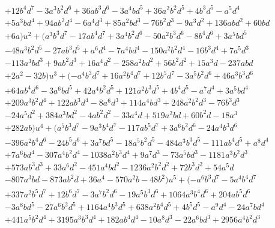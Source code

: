 \documentclass{gtpart}
\theoremstyle{definition}
\theoremstyle{remark}
\begin{document}
\begin{equation*}
\begin{split}
      & + 12 b^4 d^7 - 3 a^3 b^2 d^6 + 36 a b^3 d^6 - 3 a^4 b d^5 + 36 a^2 b^2 d^5 + 4 b^3 d^5 - a^5 d^4 \\
      & + 5 a^3 b d^4 + 94 a b^2 d^4 - 6 a^4 d^3 + 85 a^2 b d^3 - 76 b^2 d^3 - 9 a^3 d^2 + 136 a b d^2 + 60 b d \\
      & + 6 a) u^2 + (a^3 b^3 d^7 - 17 a b^4 d^7 + 3 a^4 b^2 d^6 - 50 a^2 b^3 d^6 - 8 b^4 d^6 + 3 a^5 b d^5 \\
      & - 48 a^3 b^2 d^5 - 27 a b^3 d^5 + a^6 d^4 - 7 a^4 b d^4 - 150 a^2 b^2 d^4 - 16 b^3 d^4 + 7 a^5 d^3 \\
      & - 113 a^3 b d^3 + 9 a b^2 d^3 + 16 a^4 d^2 - 258 a^2 b d^2 + 56 b^2 d^2 + 15 a^3 d - 237 a b d \\
      & + 2 a^2 - 32 b) u^3 + (-a^4 b^3 d^7 + 16 a^2 b^4 d^7 + 12 b^5 d^7 - 3 a^5 b^2 d^6 + 46 a^3 b^3 d^6 \\
      & + 64 a b^4 d^6 - 3 a^6 b d^5 + 42 a^4 b^2 d^5 + 121 a^2 b^3 d^5 + 4 b^4 d^5 - a^7 d^4 + 3 a^5 b d^4 \\
      & + 209 a^3 b^2 d^4 + 122 a b^3 d^4 - 8 a^6 d^3 + 114 a^4 b d^3 + 248 a^2 b^2 d^3 - 76 b^3 d^3 \\
      & - 24 a^5 d^2 + 384 a^3 b d^2 - 4 a b^2 d^2 - 33 a^4 d + 519 a^2 b d + 60 b^2 d - 18 a^3 \\
      & + 282 a b) u^4 + (a^5 b^3 d^7 - 9 a^3 b^4 d^7 - 117 a b^5 d^7 + 3 a^6 b^2 d^6 - 24 a^4 b^3 d^6 \\
      & - 396 a^2 b^4 d^6 - 24 b^5 d^6 + 3 a^7 b d^5 - 18 a^5 b^2 d^5 - 484 a^3 b^3 d^5 - 111 a b^4 d^5 + a^8 d^4 \\
      & + 7 a^6 b d^4 - 307 a^4 b^2 d^4 - 1038 a^2 b^3 d^4 + 9 a^7 d^3 - 73 a^5 b d^3 - 1181 a^3 b^2 d^3 \\
      & + 573 a b^3 d^3 + 33 a^6 d^2 - 451 a^4 b d^2 - 1236 a^2 b^2 d^2 + 72 b^3 d^2 + 54 a^5 d \\
      & - 807 a^3 b d - 873 a b^2 d + 36 a^4 - 570 a^2 b - 48 b^2) u^5 + (-a^6 b^3 d^7 - 5 a^4 b^4 d^7 \\
      & + 337 a^2 b^5 d^7 + 12 b^6 d^7 - 3 a^7 b^2 d^6 - 19 a^5 b^3 d^6 + 1064 a^3 b^4 d^6 + 204 a b^5 d^6 \\
      & - 3 a^8 b d^5 - 27 a^6 b^2 d^5 + 1164 a^4 b^3 d^5 + 638 a^2 b^4 d^5 + 4 b^5 d^5 - a^9 d^4 - 24 a^7 b d^4 \\
      & + 441 a^5 b^2 d^4 + 3195 a^3 b^3 d^4 + 182 a b^4 d^4 - 10 a^8 d^3 - 22 a^6 b d^3 + 2956 a^4 b^2 d^3 \\

\end{split}
\end{equation*}
\end{document}
